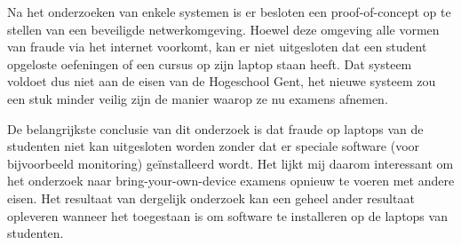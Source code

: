 Na het onderzoeken van enkele systemen is er besloten een proof-of-concept op te stellen van een beveiligde netwerkomgeving. Hoewel deze omgeving alle vormen van fraude via het internet voorkomt, kan er niet uitgesloten dat een student opgeloste oefeningen of een cursus op zijn laptop staan heeft. Dat systeem voldoet dus niet aan de eisen van de Hogeschool Gent, het nieuwe systeem zou een stuk minder veilig zijn de manier waarop ze nu examens afnemen. 

De belangrijkste conclusie van dit onderzoek is dat fraude op laptops van de studenten niet kan uitgesloten worden zonder dat er speciale software (voor bijvoorbeeld monitoring) ge\"{i}nstalleerd wordt. Het lijkt mij daarom interessant om het onderzoek naar bring-your-own-device examens opnieuw te voeren met andere eisen. Het resultaat van dergelijk onderzoek kan een geheel ander resultaat opleveren wanneer het toegestaan is om software te installeren op de laptops van studenten. 
